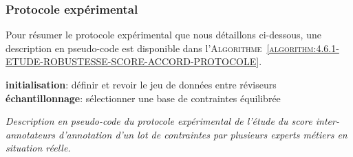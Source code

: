 		\subsubsection{Protocole expérimental}
			
			
			Pour résumer le protocole expérimental que nous détaillons ci-dessous, une description en pseudo-code est disponible dans l'\textsc{Algorithme~\ref{algorithm:4.6.1-ETUDE-ROBUSTESSE-SCORE-ACCORD-PROTOCOLE}}.

			\begin{algorithm}
				\textbf{initialisation}: définir et revoir le jeu de données entre réviseurs \;
				\textbf{échantillonnage}: sélectionner une base de contraintes équilibrée \;
				\caption{\textit{
					Description en pseudo-code du protocole expérimental de l'étude du score inter-annotateurs d'annotation d'un lot de contraintes par plusieurs experts métiers en situation réelle.
				}}
				\label{algorithm:4.6.1-ETUDE-ROBUSTESSE-SCORE-ACCORD-PROTOCOLE}
			\end{algorithm}
			
